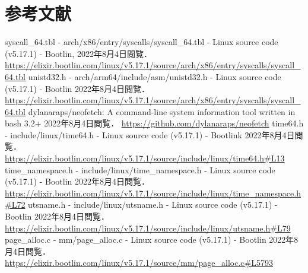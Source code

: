 \documentclass[12pt,a4paper,dvipdfmx]{jsreport}
\begin{document}








\chapter{参考文献}
\begin{thebibliography}{9}
     syscall_64.tbl - arch/x86/entry/syscalls/syscall_64.tbl - Linux source code (v5.17.1) - Bootlin,
        2022年8月4日閲覧．
        \url{https://elixir.bootlin.com/linux/v5.17.1/source/arch/x86/entry/syscalls/syscall_64.tbl}
     unistd32.h - arch/arm64/include/asm/unistd32.h - Linux source code (v5.17.1) - Bootlin
        2022年8月4日閲覧．
        \url{https://elixir.bootlin.com/linux/v5.17.1/source/arch/x86/entry/syscalls/syscall_64.tbl}
     dylanaraps/neofetch: A command-line system information tool written in bash 3.2+
        2022年8月4日閲覧．
        \url{https://github.com/dylanaraps/neofetch}
     time64.h - include/linux/time64.h - Linux source code (v5.17.1) - Bootlink
        2022年8月4日閲覧．
        \url{https://elixir.bootlin.com/linux/v5.17.1/source/include/linux/time64.h#L13}
     time_namespace.h - include/linux/time_namespace.h - Linux source code (v5.17.1) - Bootlin
        2022年8月4日閲覧．
        \url{https://elixir.bootlin.com/linux/v5.17.1/source/include/linux/time_namespace.h#L72}
     utsname.h - include/linux/utsname.h - Linux source code (v5.17.1) - Bootlin
        2022年8月4日閲覧．
        \url{https://elixir.bootlin.com/linux/v5.17.1/source/include/linux/utsname.h#L79}
     page_alloc.c - mm/page_alloc.c - Linux source code (v5.17.1) - Bootlin
        2022年8月4日閲覧．
        \url{https://elixir.bootlin.com/linux/v5.17.1/source/mm/page_alloc.c#L5793}
\end{thebibliography}
\end{document}
